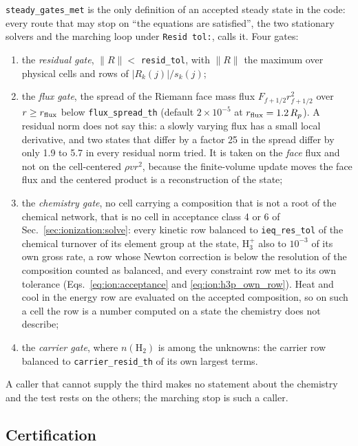 \texttt{steady\_gates\_met} is the only definition of an accepted steady state
in the code: every route that may stop on ``the equations are satisfied'', the
two stationary solvers and the marching loop under \texttt{Resid tol:}, calls
it.  Four gates:
%
\begin{enumerate}
\item the \emph{residual gate}, $\|R\| < $ \texttt{resid\_tol}, with $\|R\|$
      the maximum over physical cells and rows of $|R_k(j)|/s_k(j)$;
\item the \emph{flux gate}, the spread of the Riemann face mass flux
      $F_{f+1/2}r_{f+1/2}^2$ over $r \ge r_{\rm flux}$ below
      \texttt{flux\_spread\_th} (default $2\times10^{-5}$ at
      $r_{\rm flux} = 1.2\,R_p$).  A residual norm does not say this: a
      slowly varying flux has a small local derivative, and two states that
      differ by a factor 25 in the spread differ by only 1.9 to 5.7 in every
      residual norm tried.  It is taken on the \emph{face} flux and not on
      the cell-centered $\rho v r^2$, because the finite-volume update moves
      the face flux and the centered product is a reconstruction of the
      state;
\item the \emph{chemistry gate}, no cell carrying a composition that is not a
      root of the chemical network, that is no cell in acceptance class 4 or 6
      of Sec.~\ref{sec:ionization:solve}: every kinetic row balanced to
      \texttt{ieq\_res\_tol} of the chemical turnover of its element group at
      the state, H$_3^+$ also to $10^{-3}$ of its own gross rate, a row
      whose Newton correction is below the resolution of the composition
      counted as balanced, and every constraint row met to its own tolerance
      (Eqs.~\ref{eq:ion:acceptance} and \ref{eq:ion:h3p_own_row}).  Heat and cool in the energy row are
      evaluated on the accepted composition, so on such a cell the row is a
      number computed on a state the chemistry does not describe;
\item the \emph{carrier gate}, where $n(\mathrm{H_2})$ is among the unknowns:
      the carrier row balanced to \texttt{carrier\_resid\_th} of its own
      largest terms.
\end{enumerate}
%
A caller that cannot supply the third makes no statement about the chemistry
and the test rests on the others; the marching stop is such a caller.

\subsection{Certification}
\label{sec:steady:certification}

